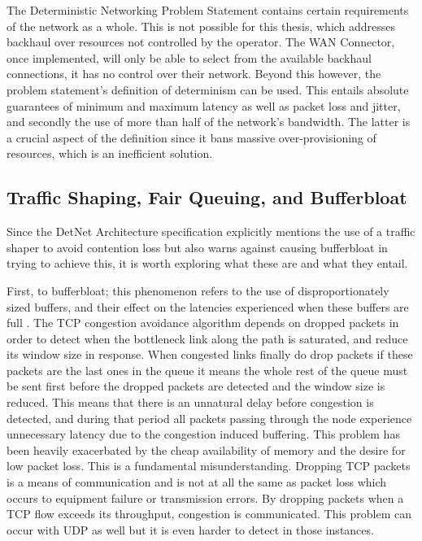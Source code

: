 The Deterministic Networking Problem Statement contains certain requirements of the network as a whole. This is not possible for this thesis, which addresses backhaul over resources not controlled by the operator. The WAN Connector, once implemented, will only be able to select from the available backhaul connections, it has no control over their network. Beyond this however, the problem statement's definition of determinism can be used. This entails absolute guarantees of minimum and maximum latency as well as packet loss and jitter, and secondly the use of more than half of the network's bandwidth. The latter is a crucial aspect of the definition since it bans massive over-provisioning of resources, which is an inefficient solution.

\subsection{Traffic Shaping, Fair Queuing, and Bufferbloat}

Since the DetNet Architecture specification \cite{detnet-arch} explicitly mentions the use of a traffic shaper to avoid contention loss but also warns against causing bufferbloat in trying to achieve this, it is worth exploring what these are and what they entail. 

First, to bufferbloat; this phenomenon refers to the use of disproportionately sized buffers, and their effect on the latencies experienced when these buffers are full \cite{allman2012comments, gettys2011bufferbloat}. The TCP congestion avoidance algorithm depends on dropped packets in order to detect when the bottleneck link along the path is saturated, and reduce its window size in response. When congested links finally do drop packets if these packets are the last ones in the queue it means the whole rest of the queue must be sent first before the dropped packets are detected and the window size is reduced. This means that there is an unnatural delay before congestion is detected, and during that period all packets passing through the node experience unnecessary latency due to the congestion induced buffering. This problem has been heavily exacerbated by the cheap availability of memory and the desire for low packet loss. This is a fundamental misunderstanding. Dropping TCP packets is a means of communication and is not at all the same as packet loss which occurs to equipment failure or transmission errors. By dropping packets when a TCP flow exceeds its throughput, congestion is communicated. This problem can occur with UDP as well but it is even harder to detect in those instances.

